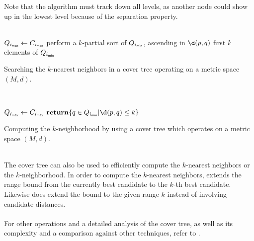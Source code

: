 	Note that the algorithm must track down all levels, as another node could show up in the lowest level because of
	the separation property.\\\\
	\IncMargin{1em}
	\begin{algorithm}
		\BlankLine
		\BlankLine
		$Q_{i_{\textsf{max}}} \leftarrow C_{i_{\textsf{max}}}$\;
		\BlankLine
		perform a $k$-partial sort of $Q_{i_{\textsf{min}}}$, ascending in $\d(p, q)$\;
		\Return first $k$ elements of $Q_{i_{\textsf{min}}}$\;
		\BlankLine
		\caption{Searching the $k$-nearest neighbors in a cover tree operating on a metric space $(M, d)$.}\label{coverTreeKSearch}
	\end{algorithm}\DecMargin{1em}\quad\\
	\IncMargin{1em}
	\begin{algorithm}
		\BlankLine
		\BlankLine
		$Q_{i_{\textsf{max}}} \leftarrow C_{i_{\textsf{max}}}$\;
		$\Return \{q \in Q_{i_{\vmin}} | \d(p, q) \le k\}$\;
		\BlankLine
		\caption{Computing the $k$-neighborhood by using a cover tree which operates on a metric space $(M, d)$.}\label{coverTreeKNeighborhood}
	\end{algorithm}\DecMargin{1em}\quad\\
	The cover tree can also be used to efficiently compute the $k$-nearest neighbors or the $k$-neighborhood.
	In order to compute the $k$-nearest neighbors,  extends the range bound from the currently
	best candidate to the $k$-th best candidate. Likewise does  extend the bound to
	the given range $k$ instead of involving candidate distances.\\\\
	For other operations and a detailed analysis of the cover tree, as well as its complexity and a comparison
	against other techniques, refer to .